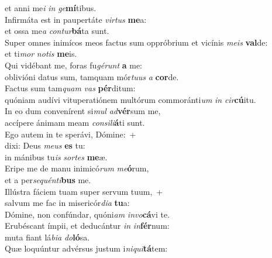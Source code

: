 \evenverse et anni me\textit{i} \textit{in} \textit{ge}\textbf{mí}tibus.\\
\oddverse Infirmáta est in paupertáte \textit{vir}\textit{tus} \textbf{me}a:~\*\\
\oddverse et ossa me\textit{a} \textit{con}\textit{tur}\textbf{bá}ta sunt.\\
\evenverse Super omnes inimícos meos factus sum oppróbrium et vicínis \textit{me}\textit{is} \textbf{val}de:~\*\\
\evenverse et ti\textit{mor} \textit{no}\textit{tis} \textbf{me}is.\\
\oddverse Qui vidébant me, foras fu\textit{gé}\textit{runt} \textbf{a} me:~\*\\
\oddverse oblivióni datus sum, tamquam mór\textit{tu}\textit{us} \textit{a} \textbf{cor}de.\\
\evenverse Factus sum tam\textit{quam} \textit{vas} \textbf{pér}ditum:~\*\\
\evenverse quóniam audívi vituperatiónem multórum commoránti\textit{um} \textit{in} \textit{cir}\textbf{cú}itu.\\
\oddverse In eo dum convenírent si\textit{mul} \textit{ad}\textbf{vér}sum me,~\*\\
\oddverse accípere ánimam meam \textit{con}\textit{si}\textit{li}\textbf{á}ti sunt.\\
\evenverse Ego autem in te sperávi, Dómine:~+\\
\evenverse  dixi: Deus \textit{me}\textit{us} \textbf{es} tu:~\*\\
\evenverse in mánibus tu\textit{is} \textit{sor}\textit{tes} \textbf{me}æ.\\
\oddverse Eripe me de manu inimicó\textit{rum} \textit{me}\textbf{ó}rum,~\*\\
\oddverse et a per\textit{se}\textit{quén}\textit{ti}\textbf{bus} me.\\
\evenverse Illústra fáciem tuam super servum tuum,~+\\
\evenverse  salvum me fac in misericór\textit{di}\textit{a} \textbf{tu}a:~\*\\
\evenverse Dómine, non confúndar, quóni\textit{am} \textit{in}\textit{vo}\textbf{cá}vi te.\\
\oddverse Erubéscant ímpii, et deducántur \textit{in} \textit{in}\textbf{fér}num:~\*\\
\oddverse muta fiant lá\textit{bi}\textit{a} \textit{do}\textbf{ló}sa.\\
\evenverse Quæ loquúntur advérsus justum i\textit{ni}\textit{qui}\textbf{tá}tem:~\*\\
